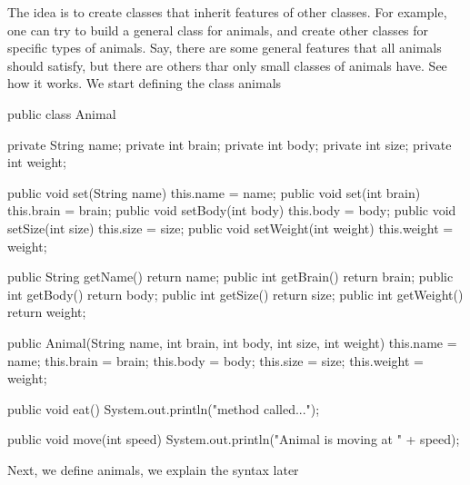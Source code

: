 The idea is to create classes that inherit features of other classes. For example,
one can try to build a general class for animals, and create other classes for 
specific types of animals. Say, there are some general features that all animals 
should satisfy, but there are others thar only small classes of animals have. 
See how it works. We start defining the class animals
\begin{listing}{1}
public class Animal {
    
    private String name;
    private int brain;
    private int body;
    private int size;
    private int weight;

    public void set(String name){
        this.name = name;
    }
    public void set(int brain){
        this.brain = brain;
    }
    public void setBody(int body) {
        this.body = body;
    }
    public void setSize(int size) {
        this.size = size;
    }
    public void setWeight(int weight) {
        this.weight = weight;
    }

    public String getName() {
        return name;
    }
    public int getBrain() {
        return brain;
    }
    public int getBody() {
        return body;
    }
    public int getSize() {
        return size;
    }
    public int getWeight() {
        return weight;
    }


    public Animal(String name, int brain, int body, int size, int weight) {
        this.name = name;
        this.brain = brain;
        this.body = body;
        this.size = size;
        this.weight = weight;
    }

    public void eat() {
        System.out.println("method called...");
    }

    public void move(int speed) {
        System.out.println("Animal is moving at " + speed);
    }
}
\end{listing}
Next, we define animals, we explain the syntax later 
